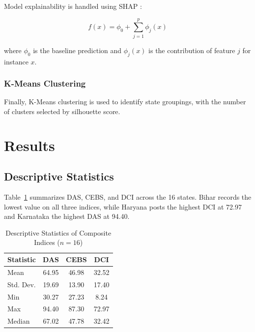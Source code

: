 \documentclass[conference]{IEEEtran}
\begin{document}
Model explainability is handled using SHAP \cite{lundberg2017}:

\begin{equation}
    f(x) = \phi_0 + \sum_{j=1}^{p} \phi_j(x)
\end{equation}

\noindent where $\phi_0$ is the baseline prediction and $\phi_j(x)$ is the contribution of feature $j$ for instance $x$.

\subsubsection{K-Means Clustering}

Finally, K-Means clustering is used to identify state groupings, with the number of clusters selected by silhouette score.

\section{Results}

\subsection{Descriptive Statistics}

Table~\ref{tab:descriptive} summarizes DAS, CEBS, and DCI across the 16 states. Bihar records the lowest value on all three indices, while Haryana posts the highest DCI at 72.97 and Karnataka the highest DAS at 94.40.

\begin{table}[!t]
\centering
\caption{Descriptive Statistics of Composite Indices ($n = 16$)}
\label{tab:descriptive}
\renewcommand{\arraystretch}{1.15}
\begin{tabular}{@{}lccc@{}}
\toprule
\textbf{Statistic} & \textbf{DAS} & \textbf{CEBS} & \textbf{DCI} \\
\midrule
Mean        & 64.95 & 46.98 & 32.52 \\
Std. Dev.   & 19.69 & 13.90 & 17.40 \\
Min         & 30.27 & 27.23 & 8.24  \\
Max         & 94.40 & 87.30 & 72.97 \\
Median      & 67.02 & 47.78 & 32.42 \\
\bottomrule
\end{tabular}
\end{table}
\end{document}
